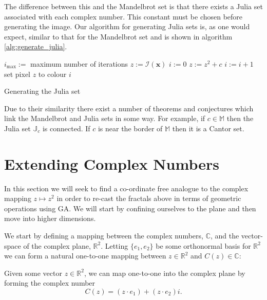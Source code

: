 The difference between this and the Mandelbrot set is that there exists a 
Julia set associated with each complex number. This constant must be chosen before
generating the image. Our algorithm for generating Julia sets is, as one would
expect, similar to that for the Mandelbrot set and is shown in algorithm
\ref{alg:generate_julia}.

\begin{fancyalg}
\begin{algorithmic}[1]
\STATE $i_{\mathrm{max}} :=$ maximum number of iterations
\STATE $z := {\mathcal I}(\mathbf{x})$
\STATE $i := 0$
  \STATE $z := z^2 + c$
  \STATE $i := i+1$
\ENDWHILE 
\STATE set pixel $z$ to colour $i$
\ENDFOR
\end{algorithmic}
\caption{
\label{alg:generate_julia}
  Generating the Julia set}
\end{fancyalg}

Due to their similarity there exist a number of theorems and conjectures which link the
Mandelbrot and Julia sets in some way. For example, if $c \in \mathbb{M}$ then
the Julia set $\mathbb{J}_c$ is connected\cite{FRAC:JuliaAndMandelbrotSets}.
If $c$ is near the border of $\mathbb{M}$ then it is a Cantor
set\cite{FRAC:JuliaAndMandelbrotSets}.

\section{Extending Complex Numbers}

In this section we will seek to find a co-ordinate free analogue to the
complex mapping $z \mapsto z^2$ in order to re-cast the fractals above in
terms of geometric operations using GA. We will start by confining ourselves
to the plane and then move into higher dimensions.

We start by defining a mapping between the complex numbers, $\mathbb{C}$, and
the vector-space of the complex plane, $\mathbb{R}^2$. Letting $\{e_1, e_2\}$
be some orthonormal basis for $\mathbb{R}^2$ we can form a natural one-to-one
mapping between $z \in \mathbb{R}^2$ and $C(z) \in \mathbb{C}$:

\begin{definition}
Given some vector $z \in \mathbb{R}^2$, we can map one-to-one into the
complex plane by forming the complex number
\[
C(z) = (z \cdot e_1) + (z \cdot e_2)i.
\]
\end{definition}

